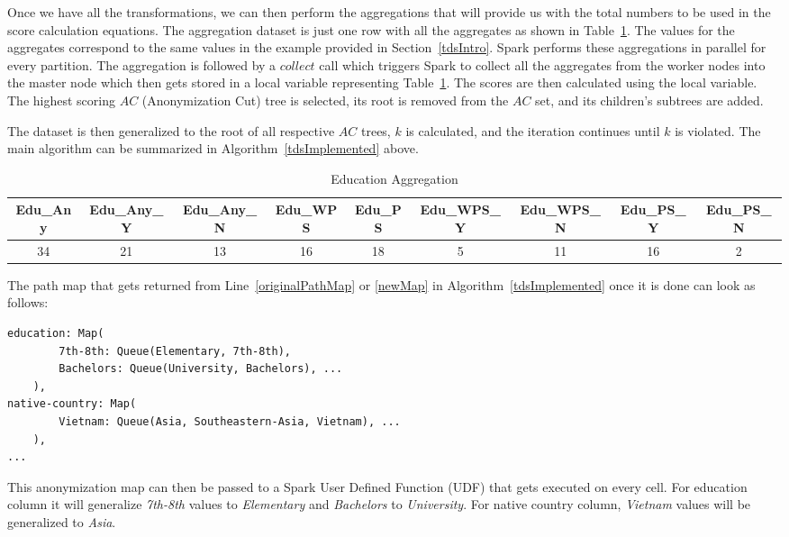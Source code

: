 \documentclass[11pt]{article}       %
\begin{document}
Once we have all the transformations, we can then perform the aggregations that will provide us with the total numbers to be used in the score calculation equations. The aggregation dataset is just one row with all the aggregates as shown in Table~\ref{table4}. The values for the aggregates correspond to the same values in the example provided in Section~\ref{tdsIntro}. Spark performs these aggregations in parallel for every partition. The aggregation is followed by a $collect$ call which triggers Spark to collect all the aggregates from the worker nodes into the master node which then gets stored in a local variable representing Table~\ref{table4}. The scores are then calculated using the local variable. The highest scoring $AC$ (Anonymization Cut) tree is selected, its root is removed from the $AC$ set, and its children's subtrees are added.

The dataset is then generalized to the root of all respective $AC$ trees, $k$ is calculated, and the iteration continues until $k$ is violated. The main algorithm can be summarized in Algorithm~\ref{tdsImplemented} above.

\begin{table}[htp]
\begin{adjustbox}{width=\textwidth, center}
\begin{tabular}{|c|c|c|c|c|c|c|c|c|}
\hline
Edu\_Any & Edu\_Any\_Y & Edu\_Any\_N & Edu\_WPS & Edu\_PS & Edu\_WPS\_Y & Edu\_WPS\_N & Edu\_PS\_Y & Edu\_PS\_N\\
\hline
34 & 21 & 13 & 16 & 18 & 5 & 11 & 16 & 2\\
\hline
\end{tabular}
\end{adjustbox}
\caption{Education Aggregation}
\label{table4}
\end{table}

The path map that gets returned from Line~\ref{originalPathMap} or \ref{newMap} in Algorithm~\ref{tdsImplemented} once it is done can look as follows:
\begin{verbatim}
education: Map(
        7th-8th: Queue(Elementary, 7th-8th),
        Bachelors: Queue(University, Bachelors), ...
    ),
native-country: Map(
        Vietnam: Queue(Asia, Southeastern-Asia, Vietnam), ...
    ),
...
\end{verbatim}
This anonymization map can then be passed to a Spark User Defined Function (UDF) that gets executed on every cell. For education column it will generalize \emph{7th-8th} values to \emph{Elementary} and \emph{Bachelors} to \emph{University}. For native country column, \emph{Vietnam} values will be generalized to \emph{Asia}.
\end{document}
